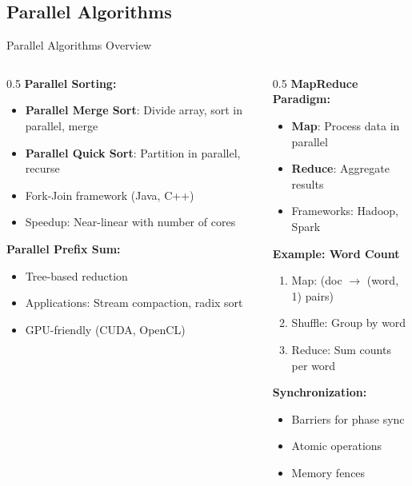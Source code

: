 \documentclass[aspectratio=169,xcolor=dvipsnames]{beamer}
\begin{document}
\subsection{Parallel Algorithms}

\begin{frame}{Parallel Algorithms Overview}
  \begin{columns}
    \begin{column}{0.5\textwidth}
      \textbf{Parallel Sorting:}
      \begin{itemize}
        \item \textbf{Parallel Merge Sort}: Divide array, sort in parallel, merge
        \item \textbf{Parallel Quick Sort}: Partition in parallel, recurse
        \item Fork-Join framework (Java, C++)
        \item Speedup: Near-linear with number of cores
      \end{itemize}

      \vspace{0.3cm}
      \textbf{Parallel Prefix Sum:}
      \begin{itemize}
        \item Tree-based reduction
        \item Applications: Stream compaction, radix sort
        \item GPU-friendly (CUDA, OpenCL)
      \end{itemize}
    \end{column}

    \begin{column}{0.5\textwidth}
      \textbf{MapReduce Paradigm:}
      \begin{itemize}
        \item \textbf{Map}: Process data in parallel
        \item \textbf{Reduce}: Aggregate results
        \item Frameworks: Hadoop, Spark
      \end{itemize}

      \vspace{0.3cm}
      \textbf{Example: Word Count}
      \begin{enumerate}
        \item Map: (doc $\to$ (word, 1) pairs)
        \item Shuffle: Group by word
        \item Reduce: Sum counts per word
      \end{enumerate}

      \vspace{0.3cm}
      \textbf{Synchronization:}
      \begin{itemize}
        \item Barriers for phase sync
        \item Atomic operations
        \item Memory fences
      \end{itemize}
    \end{column}
  \end{columns}
\end{frame}
\end{document}
